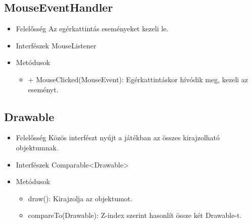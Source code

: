 \subsection{MouseEventHandler}
\begin{itemize}
\item Felelősség\newline
Az egérkattintás eseményeket kezeli le.
\item Interfészek\newline
MouseListener
\item Metódusok\newline
	\begin{itemize}
		\item + MouseClicked(MouseEvent): Egérkattintáskor hívódik meg, kezeli az eseményt.
	\end{itemize}
\end{itemize}

\subsection{Drawable}
\begin{itemize}
\item Felelősség\newline
Közös interfészt nyújt a játékban az összes kirajzolható objektumnak.
\item Interfészek\newline
Comparable<Drawable>
\item Metódusok\newline
	\begin{itemize}
		\item draw(): Kirajzolja az objektumot.
		\item compareTo(Drawable): Z-index szerint hasonlít össze két Drawable-t.
	\end{itemize}
\end{itemize}

